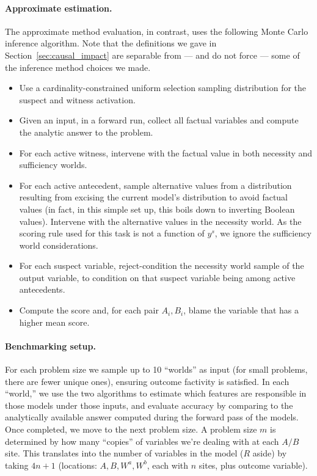 \documentclass[anon,12pt]{clear2026} %
\begin{document}
\paragraph{Approximate estimation.}

The approximate method evaluation, in contrast, uses the following Monte Carlo inference algorithm. Note that the definitions we gave in Section~\ref{sec:causal_impact} are separable from --- and do not force --- some of the inference method choices we made.


\begin{itemize}[noitemsep, topsep=1pt, leftmargin=*]
\item  Use a cardinality-constrained uniform selection sampling distribution for the suspect and witness activation.
\item  Given an input, in a forward run, collect all factual variables and compute the analytic answer to the problem.
\item For each active witness, intervene with the factual value in both necessity and sufficiency worlds.
\item For each active antecedent, sample alternative values from a distribution resulting from excising the current model's distribution to avoid factual values (in fact, in this simple set up, this boils down to inverting Boolean values).  Intervene with the alternative values in the necessity world. As the scoring rule used for this task is not a function of $y^s$, we ignore the sufficiency world considerations.
\item For each suspect variable, reject-condition the necessity world sample of the output variable, to condition on that suspect variable being among active antecedents.
\item Compute the score and, for each pair $A_i, B_i$,  blame the variable that has a higher mean score.
\end{itemize}


\paragraph{Benchmarking setup.}
For each problem size we sample up to 10 ``worlds'' as input (for small problems, there are fewer unique ones), ensuring outcome factivity is satisfied. 
In each ``world,'' we use the two algorithms to estimate which features are responsible in those models under those inputs, and evaluate accuracy by comparing to the analytically available answer computed during the forward pass of the models. Once completed, we move to the next problem size. A problem size $m$ is determined by how many ``copies'' of variables we're dealing with at each $A/B$ site. This translates into the number of variables in the model ($R$ aside) by taking $4n+1$ (locations: $A, B, W^a, W^b$, each with $n$ sites, plus outcome variable). 
\end{document}
